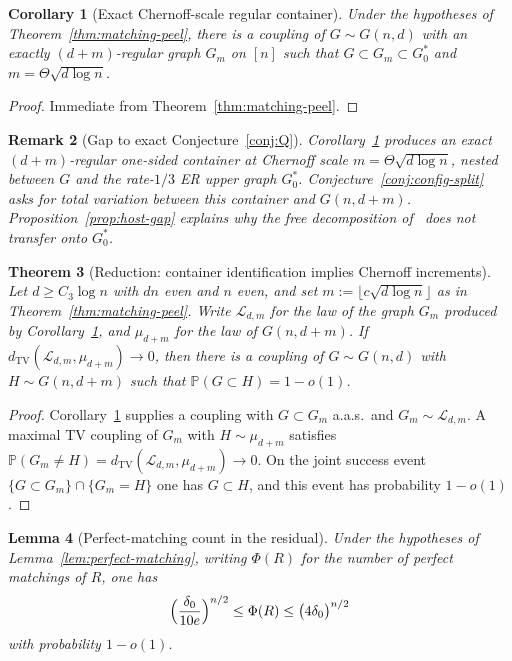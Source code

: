 \documentclass[11pt]{article}
\newtheorem{theorem}{Theorem}
\newtheorem{lemma}[theorem]{Lemma}
\newtheorem{corollary}[theorem]{Corollary}
\newtheorem{remark}[theorem]{Remark}
\newcommand{\Gnd}{G(n,d)}
\newcommand{\PP}{\mathbb{P}}
\newcommand{\dTV}{d_{\mathrm{TV}}}
\begin{document}
\begin{corollary}[Exact Chernoff-scale regular container]
\label{cor:chernoff-container}
Under the hypotheses of Theorem~\ref{thm:matching-peel}, there is a coupling of
\(G\sim\Gnd\) with an exactly \((d+m)\)-regular graph \(G_m\) on \([n]\) such that
\(G\subset G_m\subset G^*_0\) and \(m=\Theta\sqrt{d\log n}\).
\end{corollary}

\begin{proof}
Immediate from Theorem~\ref{thm:matching-peel}.
\end{proof}

\begin{remark}[Gap to exact Conjecture~\ref{conj:Q}]
\label{rem:peel-gap}
Corollary~\ref{cor:chernoff-container} produces an exact \((d+m)\)-regular one-sided
container at Chernoff scale \(m=\Theta\sqrt{d\log n}\), nested between \(G\) and the
rate-\(1/3\) ER upper graph \(G^*_0\).
Conjecture~\ref{conj:config-split} asks for total variation between this container
and \(G(n,d+m)\). Proposition~\ref{prop:host-gap} explains why the free decomposition
of~\cite{CFG25} does not transfer onto \(G^*_0\).
\end{remark}

\begin{theorem}[Reduction: container identification implies Chernoff increments]
\label{thm:id-implies-Q}
Let \(d\ge C_3\log n\) with \(dn\) even and \(n\) even, and set
\(m:=\lfloor c\sqrt{d\log n}\rfloor\) as in Theorem~\ref{thm:matching-peel}.
Write \(\mathcal{L}_{d,m}\) for the law of the graph \(G_m\) produced by
Corollary~\ref{cor:chernoff-container}, and \(\mu_{d+m}\) for the law of
\(G(n,d+m)\).
If \(\dTV(\mathcal{L}_{d,m},\mu_{d+m})\to 0\), then there is a coupling of
\(G\sim\Gnd\) with \(H\sim G(n,d+m)\) such that \(\PP(G\subset H)=1-o(1)\).
\end{theorem}

\begin{proof}
Corollary~\ref{cor:chernoff-container} supplies a coupling with
\(G\subset G_m\) a.a.s.\ and \(G_m\sim\mathcal{L}_{d,m}\).
A maximal TV coupling of \(G_m\) with \(H\sim\mu_{d+m}\) satisfies
\(\PP(G_m\neq H)=\dTV(\mathcal{L}_{d,m},\mu_{d+m})\to 0\).
On the joint success event \(\{G\subset G_m\}\cap\{G_m=H\}\) one has \(G\subset H\), and
this event has probability \(1-o(1)\).
\end{proof}

\begin{lemma}[Perfect-matching count in the residual]
\label{lem:pm-count}
Under the hypotheses of Lemma~\ref{lem:perfect-matching}, writing \(\Phi(R)\) for the
number of perfect matchings of \(R\), one has
\[
\Bigl(\frac{\delta_0}{10e}\Bigr)^{n/2}
\le\Phi(R)
\le\bigl(4\delta_0\bigr)^{n/2}
\]
with probability \(1-o(1)\).
\end{lemma}
\end{document}
